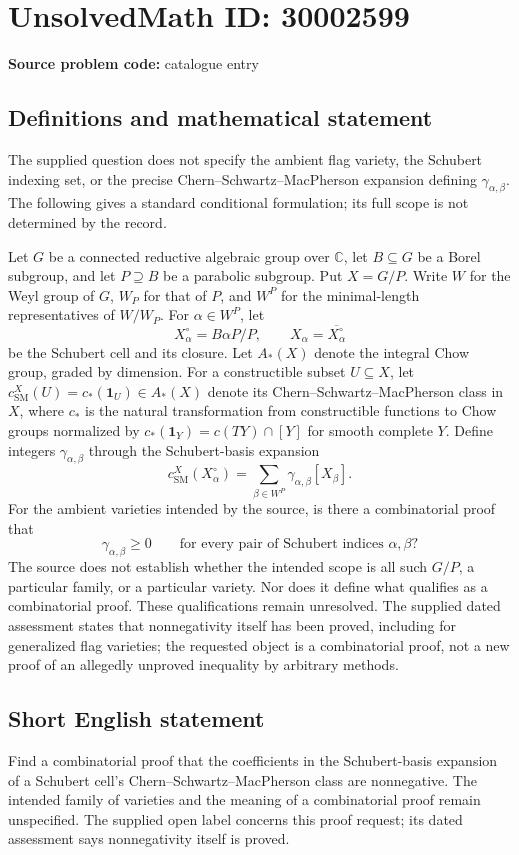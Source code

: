 \documentclass[11pt]{article}
\newcommand{\C}{\mathbb{C}}
\begin{document}
\section*{UnsolvedMath ID: 30002599}
\textbf{Source problem code:} catalogue entry
\subsection{Definitions and mathematical statement}
The supplied question does not specify the ambient flag variety, the Schubert indexing set, or the precise Chern--Schwartz--MacPherson expansion defining \(\gamma_{\alpha,\beta}\). The following gives a standard conditional formulation; its full scope is not determined by the record.

Let \(G\) be a connected reductive algebraic group over \(\C\), let \(B\subseteq G\) be a Borel subgroup, and let \(P\supseteq B\) be a parabolic subgroup. Put \(X=G/P\). Write \(W\) for the Weyl group of \(G\), \(W_P\) for that of \(P\), and \(W^P\) for the minimal-length representatives of \(W/W_P\). For \(\alpha\in W^P\), let
\[
X_\alpha^\circ=B\alpha P/P,\qquad X_\alpha=\overline{X_\alpha^\circ}
\]
be the Schubert cell and its closure. Let \(A_*(X)\) denote the integral Chow group, graded by dimension. For a constructible subset \(U\subseteq X\), let \(c_{\mathrm{SM}}^X(U)=c_*(\mathbf{1}_U)\in A_*(X)\) denote its Chern--Schwartz--MacPherson class in \(X\), where \(c_*\) is the natural transformation from constructible functions to Chow groups normalized by \(c_*(\mathbf{1}_Y)=c(TY)\cap[Y]\) for smooth complete \(Y\). Define integers \(\gamma_{\alpha,\beta}\) through the Schubert-basis expansion
\[
c_{\mathrm{SM}}^X(X_\alpha^\circ)=\sum_{\beta\in W^P}\gamma_{\alpha,\beta}[X_\beta].
\]
For the ambient varieties intended by the source, is there a combinatorial proof that
\[
\gamma_{\alpha,\beta}\geq 0\qquad\text{for every pair of Schubert indices }\alpha,\beta?
\]
The source does not establish whether the intended scope is all such \(G/P\), a particular family, or a particular variety. Nor does it define what qualifies as a combinatorial proof. These qualifications remain unresolved. The supplied dated assessment states that nonnegativity itself has been proved, including for generalized flag varieties; the requested object is a combinatorial proof, not a new proof of an allegedly unproved inequality by arbitrary methods.
\subsection{Short English statement}
Find a combinatorial proof that the coefficients in the Schubert-basis expansion of a Schubert cell's Chern--Schwartz--MacPherson class are nonnegative. The intended family of varieties and the meaning of a combinatorial proof remain unspecified. The supplied open label concerns this proof request; its dated assessment says nonnegativity itself is proved.
\end{document}
